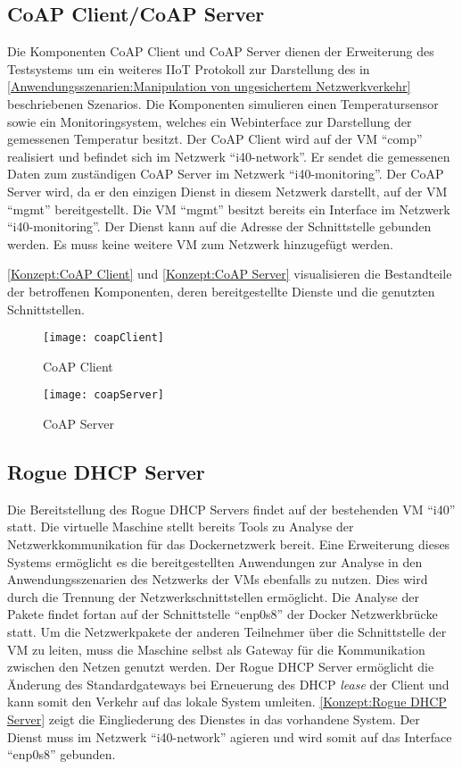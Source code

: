 \subsection{\ac{CoAP} Client/\ac{CoAP} Server}
Die Komponenten \ac{CoAP} Client und \ac{CoAP} Server dienen der Erweiterung des Testsystems um ein weiteres \ac{IIoT} Protokoll zur Darstellung des in \autoref{Anwendungsszenarien:Manipulation von ungesichertem Netzwerkverkehr} beschriebenen Szenarios. Die Komponenten simulieren einen Temperatursensor sowie ein Monitoringsystem, welches ein Webinterface zur Darstellung der gemessenen Temperatur besitzt. Der \ac{CoAP} Client wird auf der \ac{VM} "`comp"' realisiert und befindet sich im Netzwerk "`i40-network"'. Er sendet die gemessenen Daten zum zuständigen \ac{CoAP} Server im Netzwerk "`i40-monitoring"'. Der \ac{CoAP} Server wird, da er den einzigen Dienst in diesem Netzwerk darstellt, auf der \ac{VM} "`mgmt"' bereitgestellt. Die \ac{VM} "`mgmt"' besitzt bereits ein Interface im Netzwerk "`i40-monitoring"'. Der Dienst kann auf die Adresse der Schnittstelle gebunden werden. Es muss keine weitere \ac{VM} zum Netzwerk hinzugefügt werden.

\autoref{Konzept:CoAP Client} und \autoref{Konzept:CoAP Server} visualisieren die Bestandteile der betroffenen Komponenten, deren bereitgestellte Dienste und die genutzten Schnittstellen.

\begin{figure}[h]
  \centering
  \texttt{[image: coapClient]}
  \caption{CoAP Client} 
  \label{Konzept:CoAP Client}
\end{figure}

\begin{figure}[h]
  \centering
  \texttt{[image: coapServer]}
  \caption{CoAP Server} 
  \label{Konzept:CoAP Server}
\end{figure}

\subsection{Rogue \ac{DHCP} Server}
Die Bereitstellung des Rogue \ac{DHCP} Servers findet auf der bestehenden \ac{VM} "`i40"' statt. Die virtuelle Maschine stellt bereits Tools zu Analyse der Netzwerkkommunikation für das Dockernetzwerk bereit. Eine Erweiterung dieses Systems ermöglicht es die bereitgestellten Anwendungen zur Analyse in den Anwendungsszenarien des Netzwerks der \ac{VM}s ebenfalls zu nutzen. Dies wird durch die Trennung der Netzwerkschnittstellen ermöglicht. Die Analyse der Pakete findet fortan auf der Schnittstelle "`enp0s8"' der Docker Netzwerkbrücke statt. Um die Netzwerkpakete der anderen Teilnehmer über die Schnittstelle der \ac{VM} zu leiten, muss die Maschine selbst als Gateway für die Kommunikation zwischen den Netzen genutzt werden. Der Rogue \ac{DHCP} Server ermöglicht die Änderung des Standardgateways bei Erneuerung des \ac{DHCP} \textit{lease} der Client und kann somit den Verkehr auf das lokale System umleiten. \autoref{Konzept:Rogue DHCP Server} zeigt die Eingliederung des Dienstes in das vorhandene System. Der Dienst muss im Netzwerk "`i40-network"' agieren und wird somit auf das Interface "`enp0s8"' gebunden.

